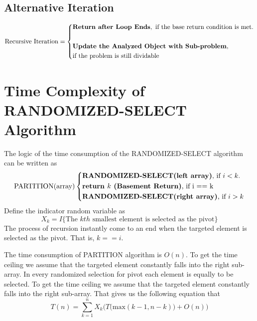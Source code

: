 \documentclass[15pt]{article}
\begin{document}
\subsection{Alternative Iteration}
\begin{equation}
\text{Recursive Iteration} = \left\{
\begin{aligned}
    &\textbf{Return after Loop Ends},~\text{if the base return condition is met}. \\&\\
    &\textbf{Update the Analyzed Object with Sub-problem},\\&\text{if the problem is still dividable} \notag
\end{aligned}
\right.
\end{equation}
\section{Time Complexity of RANDOMIZED-SELECT Algorithm}
The logic of the time consumption of the RANDOMIZED-SELECT algorithm can be written as
\begin{equation}
\text{PARTITION(array)}\left\{
\begin{aligned}
    &\text{\textbf{RANDOMIZED-SELECT(left array)}, if $i < k$.} \\
    &\text{\textbf{return $k$ (Basement Return)}, if i == k} \\
    &\text{\textbf{RANDOMIZED-SELECT(right array)}, if $i > k$} \\
\end{aligned}
\right.
\end{equation}
Define the indicator random variable as
\begin{equation}
    X_{k} = I\bigg\{ \text{The $kth$ smallest element is selected as the pivot} \bigg\}
\end{equation}
The process of recursion instantly come to an end when the targeted element is selected as the pivot. That is, $k == i$. \par
The time consumption of PARTITION algorithm is $O(n)$. To get the time ceiling we assume that the targeted element constantly falls into the right sub-array. In every randomized selection for pivot each element is equally to be selected. To get the time ceiling we assume that the targeted element constantly falls into the right sub-array. That gives us the following equation that
\begin{equation}
    T(n) = \sum_{k=1}^{n} X_k \Bigg(T\bigg(\text{max}(k-1, n-k)\bigg) + O(n)\Bigg)
\end{equation}
\end{document}
